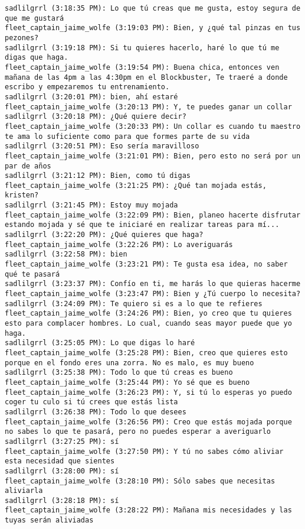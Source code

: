\begin{verbatim}
sadlilgrrl (3:18:35 PM): Lo que tú creas que me gusta, estoy segura de que me gustará
fleet_captain_jaime_wolfe (3:19:03 PM): Bien, y ¿qué tal pinzas en tus pezones? 
sadlilgrrl (3:19:18 PM): Si tu quieres hacerlo, haré lo que tú me digas que haga.
fleet_captain_jaime_wolfe (3:19:54 PM): Buena chica, entonces ven mañana de las 4pm a las 4:30pm en el Blockbuster, Te traeré a donde escribo y empezaremos tu entrenamiento.
sadlilgrrl (3:20:01 PM): bien, ahí estaré
fleet_captain_jaime_wolfe (3:20:13 PM): Y, te puedes ganar un collar
sadlilgrrl (3:20:18 PM): ¿Qué quiere decir?
fleet_captain_jaime_wolfe (3:20:33 PM): Un collar es cuando tu maestro te ama lo suficiente como para que formes parte de su vida
sadlilgrrl (3:20:51 PM): Eso sería maravilloso
fleet_captain_jaime_wolfe (3:21:01 PM): Bien, pero esto no será por un par de años
sadlilgrrl (3:21:12 PM): Bien, como tú digas
fleet_captain_jaime_wolfe (3:21:25 PM): ¿Qué tan mojada estás, kristen?
sadlilgrrl (3:21:45 PM): Estoy muy mojada
fleet_captain_jaime_wolfe (3:22:09 PM): Bien, planeo hacerte disfrutar estando mojada y sé que te iniciaré en realizar tareas para mí...
sadlilgrrl (3:22:20 PM): ¿Qué quieres que haga?
fleet_captain_jaime_wolfe (3:22:26 PM): Lo averiguarás
sadlilgrrl (3:22:58 PM): bien
fleet_captain_jaime_wolfe (3:23:21 PM): Te gusta esa idea, no saber qué te pasará
sadlilgrrl (3:23:37 PM): Confío en ti, me harás lo que quieras hacerme
fleet_captain_jaime_wolfe (3:23:47 PM): Bien y ¿Tú cuerpo lo necesita?
sadlilgrrl (3:24:09 PM): Te quiero si es a lo que te refieres
fleet_captain_jaime_wolfe (3:24:26 PM): Bien, yo creo que tu quieres esto para complacer hombres. Lo cual, cuando seas mayor puede que yo haga.
sadlilgrrl (3:25:05 PM): Lo que digas lo haré
fleet_captain_jaime_wolfe (3:25:28 PM): Bien, creo que quieres esto porque en el fondo eres una zorra. No es malo, es muy bueno
sadlilgrrl (3:25:38 PM): Todo lo que tú creas es bueno
fleet_captain_jaime_wolfe (3:25:44 PM): Yo sé que es bueno
fleet_captain_jaime_wolfe (3:26:23 PM): Y, si tú lo esperas yo puedo coger tu culo si tú crees que estás lista 
sadlilgrrl (3:26:38 PM): Todo lo que desees
fleet_captain_jaime_wolfe (3:26:56 PM): Creo que estás mojada porque no sabes lo que te pasará, pero no puedes esperar a averiguarlo
sadlilgrrl (3:27:25 PM): sí
fleet_captain_jaime_wolfe (3:27:50 PM): Y tú no sabes cómo aliviar esta necesidad que sientes
sadlilgrrl (3:28:00 PM): sí
fleet_captain_jaime_wolfe (3:28:10 PM): Sólo sabes que necesitas aliviarla
sadlilgrrl (3:28:18 PM): sí
fleet_captain_jaime_wolfe (3:28:22 PM): Mañana mis necesidades y las tuyas serán aliviadas

\end{verbatim}
